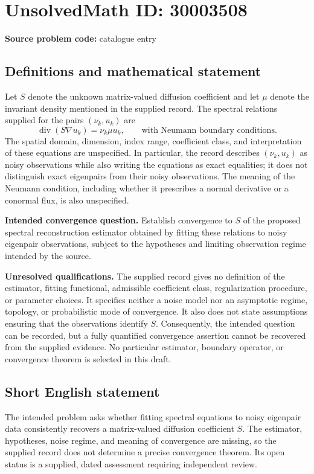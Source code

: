 \documentclass[11pt]{article}
\begin{document}
\section*{UnsolvedMath ID: 30003508}
\textbf{Source problem code:} catalogue entry
\subsection{Definitions and mathematical statement}
Let \(S\) denote the unknown matrix-valued diffusion coefficient and let \(\mu\) denote the invariant density mentioned in the supplied record. The spectral relations supplied for the pairs \((\nu_k,u_k)\) are
\[
\operatorname{div}(S\nabla u_k)=\nu_k\mu u_k,
\qquad \text{with Neumann boundary conditions}.
\]
The spatial domain, dimension, index range, coefficient class, and interpretation of these equations are unspecified. In particular, the record describes \((\nu_k,u_k)\) as noisy observations while also writing the equations as exact equalities; it does not distinguish exact eigenpairs from their noisy observations. The meaning of the Neumann condition, including whether it prescribes a normal derivative or a conormal flux, is also unspecified.

\textbf{Intended convergence question.} Establish convergence to \(S\) of the proposed spectral reconstruction estimator obtained by fitting these relations to noisy eigenpair observations, subject to the hypotheses and limiting observation regime intended by the source.

\textbf{Unresolved qualifications.} The supplied record gives no definition of the estimator, fitting functional, admissible coefficient class, regularization procedure, or parameter choices. It specifies neither a noise model nor an asymptotic regime, topology, or probabilistic mode of convergence. It also does not state assumptions ensuring that the observations identify \(S\). Consequently, the intended question can be recorded, but a fully quantified convergence assertion cannot be recovered from the supplied evidence. No particular estimator, boundary operator, or convergence theorem is selected in this draft.
\subsection{Short English statement}
The intended problem asks whether fitting spectral equations to noisy eigenpair data consistently recovers a matrix-valued diffusion coefficient \(S\). The estimator, hypotheses, noise regime, and meaning of convergence are missing, so the supplied record does not determine a precise convergence theorem. Its open status is a supplied, dated assessment requiring independent review.
\end{document}
